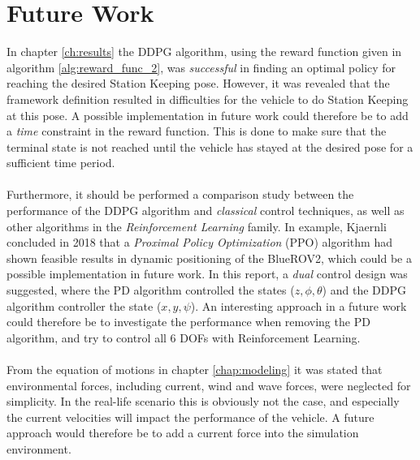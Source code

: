 \chapter{Future Work}
In chapter \ref{ch:results} the DDPG algorithm, using the reward function given in algorithm \ref{alg:reward_func_2}, was \textit{successful} in finding an optimal policy for reaching the desired Station Keeping pose. However, it was revealed that the framework definition resulted in difficulties for the vehicle to do Station Keeping at this pose. A possible implementation in future work could therefore be to add a \textit{time} constraint in the reward function. This is done to make sure that the terminal state is not reached until the vehicle has stayed at the desired pose for a sufficient time period.\\\\
Furthermore, it should be performed a comparison study between the performance of the DDPG algorithm and \textit{classical} control techniques, as well as other algorithms in the \textit{Reinforcement Learning} family. In example, Kjaernli \cite{Kjaernli} concluded in 2018 that a \textit{Proximal Policy Optimization} (PPO) algorithm had shown feasible results in dynamic positioning of the BlueROV2, which could be a possible implementation in future work. In this report, a \textit{dual} control design was suggested, where the PD algorithm controlled the states ($z, \phi, \theta$) and the DDPG algorithm controller the state ($x, y, \psi$). An interesting approach in a future work could therefore be to investigate the performance when removing the PD algorithm, and try to control all 6 DOFs with Reinforcement Learning.\\\\
From the equation of motions in chapter \ref{chap:modeling} it was stated that environmental forces, including current, wind and wave forces, were neglected for simplicity. In the real-life scenario this is obviously not the case, and especially the current velocities will impact the performance of the vehicle. A future approach would therefore be to add a current force into the simulation environment. 
